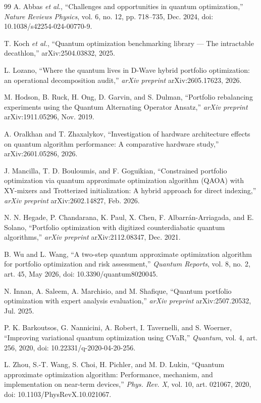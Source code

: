 \documentclass{ieeeaccess}
\begin{document}
\begin{thebibliography}{99}
 A. Abbas \textit{et al.}, ``Challenges and opportunities in quantum optimization,'' \textit{Nature Reviews Physics}, vol. 6, no. 12, pp. 718--735, Dec. 2024, doi: 10.1038/s42254-024-00770-9.

 T. Koch \textit{et al.}, ``Quantum optimization benchmarking library --- The intractable decathlon,'' arXiv:2504.03832, 2025.

 L. Lozano, ``Where the quantum lives in D-Wave hybrid portfolio optimization: an operational decomposition audit,'' \textit{arXiv preprint} arXiv:2605.17623, 2026.

 M. Hodson, B. Ruck, H. Ong, D. Garvin, and S. Dulman, ``Portfolio rebalancing experiments using the Quantum Alternating Operator Ansatz,'' \textit{arXiv preprint} arXiv:1911.05296, Nov. 2019.

 A. Oralkhan and T. Zhaxalykov, ``Investigation of hardware architecture effects on quantum algorithm performance: A comparative hardware study,'' arXiv:2601.05286, 2026.

 J. Mancilla, T. D. Bouloumis, and F. Goguikian, ``Constrained portfolio optimization via quantum approximate optimization algorithm (QAOA) with XY-mixers and Trotterized initialization: A hybrid approach for direct indexing,'' \textit{arXiv preprint} arXiv:2602.14827, Feb. 2026.

 N. N. Hegade, P. Chandarana, K. Paul, X. Chen, F. Albarr\'{a}n-Arriagada, and E. Solano, ``Portfolio optimization with digitized counterdiabatic quantum algorithms,'' \textit{arXiv preprint} arXiv:2112.08347, Dec. 2021.

 B. Wu and L. Wang, ``A two-step quantum approximate optimization algorithm for portfolio optimization and risk assessment,'' \textit{Quantum Reports}, vol. 8, no. 2, art. 45, May 2026, doi: 10.3390/quantum8020045.

 N. Innan, A. Saleem, A. Marchisio, and M. Shafique, ``Quantum portfolio optimization with expert analysis evaluation,'' \textit{arXiv preprint} arXiv:2507.20532, Jul. 2025.

 P. K. Barkoutsos, G. Nannicini, A. Robert, I. Tavernelli, and S. Woerner, ``Improving variational quantum optimization using CVaR,'' \textit{Quantum}, vol. 4, art. 256, 2020, doi: 10.22331/q-2020-04-20-256.

 L. Zhou, S.-T. Wang, S. Choi, H. Pichler, and M. D. Lukin, ``Quantum approximate optimization algorithm: Performance, mechanism, and implementation on near-term devices,'' \textit{Phys. Rev. X}, vol. 10, art. 021067, 2020, doi: 10.1103/PhysRevX.10.021067.


\end{thebibliography}
\end{document}
